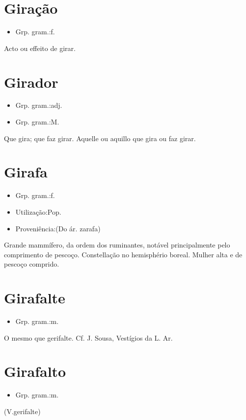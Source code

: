 \section{Giração}
\begin{itemize}
\item {Grp. gram.:f.}
\end{itemize}
Acto ou effeito de girar.
\section{Girador}
\begin{itemize}
\item {Grp. gram.:adj.}
\end{itemize}
\begin{itemize}
\item {Grp. gram.:M.}
\end{itemize}
Que gira; que faz girar.
Aquelle ou aquillo que gira ou faz girar.
\section{Girafa}
\begin{itemize}
\item {Grp. gram.:f.}
\end{itemize}
\begin{itemize}
\item {Utilização:Pop.}
\end{itemize}
\begin{itemize}
\item {Proveniência:(Do ár. \textunderscore zarafa\textunderscore )}
\end{itemize}
Grande mammífero, da ordem dos ruminantes, notável principalmente pelo comprimento de pescoço.
Constellação no hemisphério boreal.
Mulher alta e de pescoço comprido.
\section{Girafalte}
\begin{itemize}
\item {Grp. gram.:m.}
\end{itemize}
O mesmo que \textunderscore gerifalte\textunderscore .
Cf. J. Sousa, \textunderscore Vestígios da L. Ar.\textunderscore 
\section{Girafalto}
\begin{itemize}
\item {Grp. gram.:m.}
\end{itemize}
(V.gerifalte)
